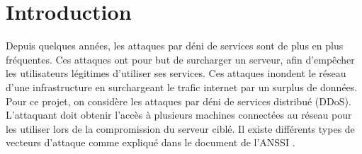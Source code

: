 \chapter*{Introduction}

\label{sec:intro}

Depuis quelques années, les attaques par déni de services sont de plus en plus fréquentes. Ces attaques ont pour but de surcharger un serveur, afin d'empêcher les utilisateurs légitimes d'utiliser ses services. Ces attaques inondent le réseau d'une infrastructure en surchargeant le trafic internet par un surplus de données. Pour ce projet, on considère les attaques par déni de services distribué (DDoS). L'attaquant doit obtenir l'accès à plusieurs machines connectées au réseau pour les utiliser lors de la compromission du serveur ciblé. Il existe différents types de vecteurs d'attaque comme expliqué dans le document de l'ANSSI \cite{Ans15}.\newline

